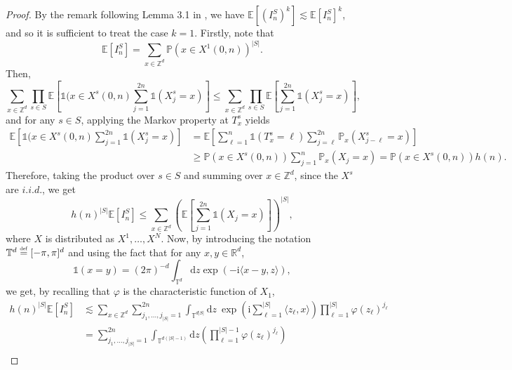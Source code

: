 \documentclass[10pt,a4paper]{amsart}
\newcommand{\RR}{\mathbb R}
\newcommand{\EE}{\mathbb E}
\newcommand{\TT}{\mathbb T}
\newcommand{\PP}{\mathbb P}
\newcommand{\1}{\mathds{1}}
\newcommand{\ZZ}{\mathbb Z}
\renewcommand{\d}{\mathrm d}
\renewcommand{\i}{\mathrm i}
\newcommand{\eqdef}{\stackrel{\scaleto{\mathrm{def}}{3.5pt}}{=}}
\numberwithin{equation}{section}
\begin{document}
\begin{proof}
    By the remark following Lemma 3.1 in \cite{LeGallRosenRangeOfStableRandomWalks1991}, we have $\EE\left[(I_n^S)^k\right]\lesssim\EE\left[I_n^S\right]^k$, and so it is sufficient to treat the case $k=1$. Firstly, note that
    \begin{equation*}
        \EE\left[I_n^S\right]=\sum_{x\in\ZZ^d}\PP\left(x\in X^1(0,n)\right)^{|S|}.
    \end{equation*}
    Then, 
    \begin{equation}
    \label{ineq:easy bound for inequality of moments of intersections}
        \sum_{x\in\ZZ^d}\prod_{s\in S}\EE\left[\1(x\in X^s(0,n)\sum_{j=1}^{2n}\1(X_j^s=x)\right]\le \sum_{x\in\ZZ^d}\prod_{s\in S}\EE\left[\sum_{j=1}^{2n}\1\left(X_j^s=x\right)\right],
    \end{equation}
    and for any $s\in S$, applying the Markov property at $T_x^s$ yields
    \begin{align*}
        \EE\left[\1(x\in X^s(0,n)\sum_{j=1}^{2n}\1(X_j^s=x)\right]&=\EE\left[\sum_{\ell=1}^n\1\left(T_x^s=\ell\right)\sum_{j=\ell}^{2n}\PP_x\left(X_{j-\ell}^s=x\right)\right]\\
        &\ge\PP\left(x\in X^s(0,n)\right)\sum_{j=1}^n\PP_x\left(X_j=x\right)=\PP\left(x\in X^s(0,n)\right) h(n).
    \end{align*}
    Therefore, taking the product over $s\in S$ and summing over $x\in\ZZ^d$, since the $X^s$ are $i.i.d.$, we get 
    \begin{equation*}
        h(n)^{|S|}\EE\left[I_n^S\right]\le\sum_{x\in\ZZ^d}\left(\EE\left[\sum_{j=1}^{2n}\1\left(X_j=x\right)\right]\right)^{|S|},
    \end{equation*}
    where $X$ is distributed as $X^1,\dots,X^N$. Now, by introducing the notation $\TT^d\eqdef[-\pi,\pi]^d$ and using the fact that for any $x,y\in\RR^d$, 
    \begin{equation*}
        \1(x=y)=(2\pi)^{-d}\int_{\TT^d}\d z\exp\left(-\i\langle x-y,z\rangle\right),
    \end{equation*}
    we get, by recalling that $\varphi$ is the characteristic function of $X_1$, 
    \begin{align*}
        h(n)^{|S|}\EE\left[I_n^S\right]&\lesssim\sum_{x\in\ZZ^d}\sum_{j_1,\dots,j_{|S|}=1}^{2n}\int_{\TT^{d|S|}}\d z\ \exp\left(\i\sum_{\ell=1}^{|S|}\langle z_\ell, x\rangle\right)\prod_{\ell=1}^{|S|}\varphi(z_\ell)^{j_\ell}\\
        &=\sum_{j_1,\dots,j_{|S|}=1}^{2n}\int_{\TT^{d(|S|-1)}}\d z\left(\prod_{\ell=1}^{|S|-1}\varphi(z_\ell)^{j_\ell}\right)\\

\end{align*}
\end{proof}
\end{document}
